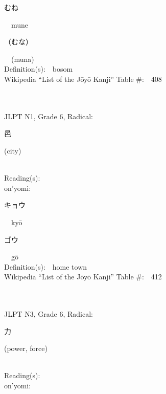 \begin{multicols}{2}
{\hspace*{2em}}{\begin{CJK}{UTF8}{min} むね \end{CJK}}\ \ mune\ \ \\
{\hspace*{2em}}{\begin{CJK}{UTF8}{min} （むな） \end{CJK}}\ \ (muna)\ \ \\
Definition(s):\ \ bosom \\
Wikipedia ``List of the J\=oy\=o Kanji'' Table \#:\ \ 408 \\
\ \ \\
{\fontsize{34pt}{40pt}  }\ \ \\  %
{JLPT N1, Grade 6, Radical:\ \ {\begin{CJK}{UTF8}{min} 邑 \end{CJK}} (city) } \\
Reading(s):\ \ \\
{\hspace*{1em}}on'yomi:\ \ \\
{\hspace*{2em}}{\begin{CJK}{UTF8}{min} キョウ \end{CJK}}\ \ ky\=o\ \ \\
{\hspace*{2em}}{\begin{CJK}{UTF8}{min} ゴウ \end{CJK}}\ \ g\=o\ \ \\
Definition(s):\ \ home town \\
Wikipedia ``List of the J\=oy\=o Kanji'' Table \#:\ \ 412 \\
\ \ \\
{\fontsize{34pt}{40pt}  }\ \ \\  %
{JLPT N3, Grade 6, Radical:\ \ {\begin{CJK}{UTF8}{min} 力 \end{CJK}} (power, force) } \\
Reading(s):\ \ \\
{\hspace*{1em}}on'yomi:\ \ \\

\end{multicols}
